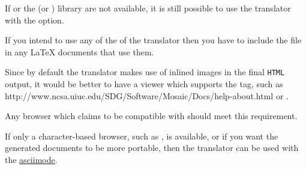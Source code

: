 \noindent
If  or the  (or ) library are not
available, it is still possible to
use the translator with the  option.

%
%
\html{\\}%

If you intend to use any of the 
of the translator 
then you have to include the  file
in any \LaTeX{}  documents that use them.

%
%
%
%
%
%
\html{\\}%

Since by default the translator makes use of inlined images in the final
\texttt{HTML} output, it would be better to have a viewer
which supports the  tag, such as %
{http://www.ncsa.uiuc.edu/SDG/Software/Mosaic/Docs/help-about.html}
or .
\begin{changebar}
Any browser which claims to be compatible with \HTMLiii{} should meet
this requirement.
\end{changebar}

%
%
\html{\\}%

If only a character-based browser, such as , is available,
or if you want the generated documents to be more portable,
then the translator can be used with the 
\hyperref{option}{option (see Section~}{)}{asciimode}.



